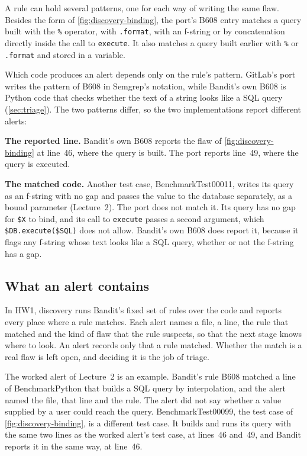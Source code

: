 A rule can hold several patterns, one for each way of writing the same flaw. Besides the form of
\cref{fig:discovery-binding}, the port's B608 entry matches a query built with the \texttt{\%}
operator, with \texttt{.format}, with an f-string or by concatenation directly inside the call to
\texttt{execute}. It also matches a query built earlier with \texttt{\%} or \texttt{.format} and
stored in a variable.

Which code produces an alert depends only on the rule's pattern. GitLab's port writes the pattern
of B608 in Semgrep's notation, while Bandit's own B608 is Python code that checks whether the text
of a string looks like a SQL query (\cref{sec:triage}). The two patterns differ, so the two
implementations report different alerts:
\bi
\item \textbf{The reported line.} Bandit's own B608 reports the flaw of
\cref{fig:discovery-binding} at line~46, where the query is built. The port reports line~49, where
the query is executed.
\item \textbf{The matched code.} Another test case, BenchmarkTest00011, writes its query as an
f-string with no gap and passes the value to the database separately, as a bound parameter
(Lecture~2). The port does not match it. Its query has no gap for \texttt{\$X} to bind, and its
call to \texttt{execute} passes a second argument, which \texttt{\$DB.execute(\$SQL)} does not
allow. Bandit's own B608 does report it, because it flags any f-string whose text looks like a SQL
query, whether or not the f-string has a gap.
\ei

\subsection{What an alert contains}
\label{sec:discovery-alerts}

In HW1, discovery runs Bandit's fixed set of rules over the code and reports every place where a
rule matches. Each alert names a file, a line, the rule that matched and the kind of flaw that the
rule suspects, so that the next stage knows where to look. An alert records only that a rule
matched. Whether the match is a real flaw is left open, and deciding it is the job of triage.

The worked alert of Lecture~2 is an example. Bandit's rule B608 matched a line of BenchmarkPython that
builds a SQL query by interpolation, and the alert named the file, that line and the rule. The alert
did not say whether a value supplied by a user could reach the query. BenchmarkTest00099, the test
case of \cref{fig:discovery-binding}, is a different test case. It builds and runs its query with the
same two lines as the worked alert's test case, at lines~46 and~49, and Bandit reports it in the
same way, at line~46.

